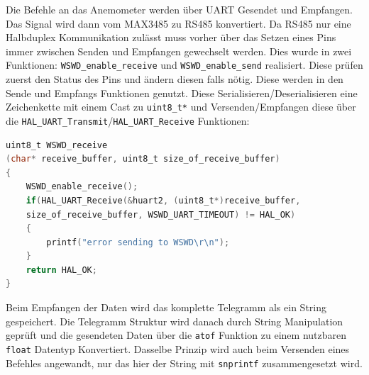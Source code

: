\noindent Die Befehle an das Anemometer werden über \ac{UART} Gesendet und Empfangen. Das Signal wird dann vom MAX3485 zu RS485 konvertiert. Da RS485 nur eine Halbduplex Kommunikation zulässt muss vorher über das Setzen eines Pins immer zwischen Senden und Empfangen gewechselt werden. Dies wurde in zwei Funktionen: \verb|WSWD_enable_receive| und \verb|WSWD_enable_send| realisiert. Diese prüfen zuerst den Status des Pins und ändern diesen falls nötig. Diese werden in den Sende und Empfangs Funktionen genutzt. Diese Serialisieren/Deserialisieren eine Zeichenkette mit einem Cast zu \verb|uint8_t*| und Versenden/Empfangen diese über die \verb|HAL_UART_Transmit|/\verb|HAL_UART_Receive| Funktionen:
\begin{lstlisting}[language=C, caption={Empfangen einer Nachricht vom WSWD}, label={lst:WSWDreceive}]
uint8_t WSWD_receive
(char* receive_buffer, uint8_t size_of_receive_buffer)
{
	WSWD_enable_receive();
	if(HAL_UART_Receive(&huart2, (uint8_t*)receive_buffer, 
	size_of_receive_buffer, WSWD_UART_TIMEOUT) != HAL_OK)
	{
		printf("error sending to WSWD\r\n");
	}
	return HAL_OK;
}
\end{lstlisting}
Beim Empfangen der Daten wird das komplette Telegramm als ein String gespeichert. Die Telegramm Struktur wird danach durch String Manipulation geprüft und die gesendeten Daten über die \verb|atof| Funktion zu einem nutzbaren \verb|float| Datentyp Konvertiert. Dasselbe Prinzip wird auch beim Versenden eines Befehles angewandt, nur das hier der String mit \verb|snprintf| zusammengesetzt wird.\\
